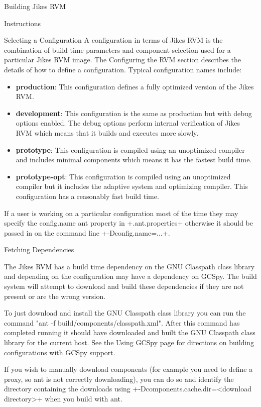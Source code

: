 \begin{section}{Building Jikes RVM}
\begin{subsection}{Instructions}
\begin{subsubsection}{Selecting a Configuration}
A configuration in terms of Jikes RVM is the combination of build time parameters and component selection used for a particular Jikes RVM image. The Configuring the RVM section describes the details of how to define a configuration. Typical configuration names include:
\begin{itemize}
  \item \textbf{production}: This configuration defines a fully optimized version of the Jikes RVM.
  \item \textbf{development}: This configuration is the same as production but with debug options enabled. The debug options perform internal verification of Jikes RVM which means that it builds and executes more slowly.
  \item \textbf{prototype}: This configuration is compiled using an unoptimized compiler and includes minimal components which means it has the fastest build time.
  \item \textbf{prototype-opt}: This configuration is compiled using an unoptimized compiler but it includes the adaptive system and optimizing compiler. This configuration has a reasonably fast build time.
\end{itemize}

If a user is working on a particular configuration most of the time they may specify the config.name ant property in \spverb+.ant.properties+ otherwise it should be passed in on the command line \spverb+-Dconfig.name=...+.

\end{subsubsection}

\begin{subsubsection}{Fetching Dependencies}

The Jikes RVM has a build time dependency on the GNU Classpath class library and depending on the configuration may have a dependency on GCSpy. The build system will attempt to download and build these dependencies if they are not present or are the wrong version.

To just download and install the GNU Classpath class library you can run the command "ant -f build/components/classpath.xml". After this command has completed running it should have downloaded and built the GNU Classpath class library for the current host. See the Using GCSpy page for directions on building configurations with GCSpy support.

If you wish to manually download components (for example you need to define a proxy, so ant is not correctly downloading), you can do so and identify the directory containing the downloads using \spverb+-Dcomponents.cache.dir=<download directory>+ when you build with ant.


\end{subsubsection}
\end{subsection}
\end{section}
